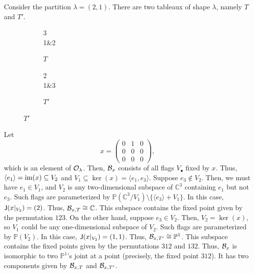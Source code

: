 \begin{example}[exp:]{}
    Consider the partition $\lambda = (2, 1)$. There are two tableaux of shape $\lambda$, namely $T$ and $T'$.
    \begin{figure}[H]
        \centering
        \begin{subfigure}{.45\linewidth}
            \centering
            \begin{ytableau}
                3\\1&2
            \end{ytableau}
            \caption{$T$}
        \end{subfigure}
        \begin{subfigure}{.45\linewidth}
            \centering
            \begin{ytableau}
                2\\1&3
            \end{ytableau}
            \caption{$T'$}
        \end{subfigure}
    \end{figure}
    Let
    \begin{equation*}
        x =
        \begin{pmatrix}
            0 & 1 & 0 \\
            0 & 0 & 0 \\
            0 & 0 & 0
        \end{pmatrix},
    \end{equation*}
    which is an element of $\mathcal{O}_\lambda$. Then, $\mathcal{B}_x$ consists of all flags $V_\bullet$ fixed by $x$. Thus, $\langle e_1 \rangle = \operatorname{im}(x) \subseteq V_2$ and $V_1 \subseteq \ker(x) = \langle e_1, e_3 \rangle$. 
    Suppose $e_3 \notin V_2$. Then, we must have $e_1 \in V_1$, and $V_2$ is any two-dimensional subspace of $\mathbb{C}^3$ containing $e_1$ but not $e_3$. Such flags are parameterized by $\mathbb{P}(\mathbb{C}^3/V_1) \setminus \{\langle e_3 \rangle + V_1\}$. In this case, $\mathsf{J}(x|_{V_2}) = (2)$. Thus, $\mathcal{B}_{x, T} \cong \mathbb{C}$. This subspace contains the fixed point given by the permutation $123$.
    On the other hand, suppose $e_3 \in V_2$. Then, $V_2 = \ker(x)$, so $V_1$ could be any one-dimensional subspace of $V_2$. Such flags are parameterized by $\mathbb{P}(V_2)$. In this case, $\mathsf{J}(x|_{V_2}) = (1, 1)$. Thus, $\mathcal{B}_{x, T'} \cong \mathbb{P}^1$. This subspace contains the fixed points given by the permutations $312$ and $132$.
    Thus, $\mathcal{B}_x$ is isomorphic to two $\mathbb{P}^1$'s joint at a point (precisely, the fixed point $312$). It has two components given by $\mathcal{B}_{x, T}$ and $\mathcal{B}_{x, T'}$.


\end{example}
